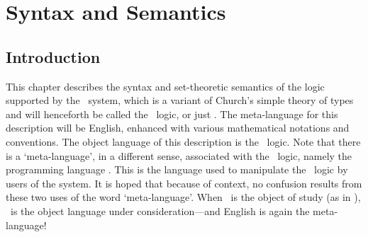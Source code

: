 \chapter{Syntax and Semantics}\label{logic}

\section{Introduction}
\label{introduction}

This chapter describes the syntax and set-theoretic semantics of the
logic supported by the \HOL\ system, which is a variant of
Church's simple theory of types \cite{Church} and
will henceforth be called the \HOL\ logic, or just \HOL.  The
meta-language for this description will be English, enhanced with
various mathematical notations and conventions.  The object language
of this description is the \HOL\ logic.  Note that there is a
`meta-language', in a different sense, associated with the \HOL\
logic, namely the programming language \ML.  This is the language used
to manipulate the \HOL\ logic by users of the system.  It is hoped
that because of context, no confusion results from these two uses of
the word `meta-language'.  When \ML\ is the object of study (as in
\cite{sml}), \ML\ is the object language under consideration---and
English is again the meta-language!

